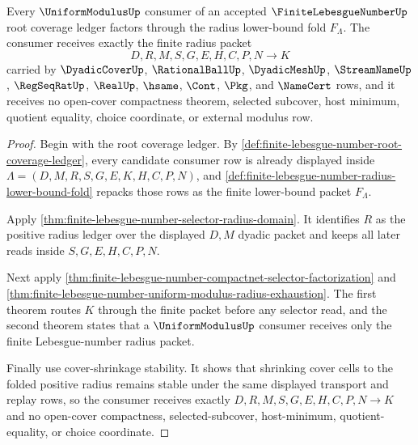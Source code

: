 \begin{theorem}
\label{thm:finite-lebesgue-number-uniform-modulus-consumer-exactness}
Every $\UniformModulusUp$ consumer of an accepted $\FiniteLebesgueNumberUp$ root coverage ledger factors through the radius lower-bound fold $F_\Lambda$. The consumer receives exactly the finite radius packet
$$
D,R,M,S,G,E,H,C,P,N \to K
$$
carried by $\DyadicCoverUp$, $\RationalBallUp$, $\DyadicMeshUp$, $\StreamNameUp$, $\RegSeqRatUp$, $\RealUp$, $\hsame$, $\Cont$, $\Pkg$, and $\NameCert$ rows, and it receives no open-cover compactness theorem, selected subcover, host minimum, quotient equality, choice coordinate, or external modulus row.
\end{theorem}
\begin{proof}
Begin with the root coverage ledger. By \autoref{def:finite-lebesgue-number-root-coverage-ledger}, every candidate consumer row is already displayed inside $\Lambda=(D,M,R,S,G,E,K,H,C,P,N)$, and \autoref{def:finite-lebesgue-number-radius-lower-bound-fold} repacks those rows as the finite lower-bound packet $F_\Lambda$.

Apply \autoref{thm:finite-lebesgue-number-selector-radius-domain}. It identifies $R$ as the positive radius ledger over the displayed $D,M$ dyadic packet and keeps all later reads inside $S,G,E,H,C,P,N$.

Next apply \autoref{thm:finite-lebesgue-number-compactnet-selector-factorization} and \autoref{thm:finite-lebesgue-number-uniform-modulus-radius-exhaustion}. The first theorem routes $K$ through the finite packet before any selector read, and the second theorem states that a $\UniformModulusUp$ consumer receives only the finite Lebesgue-number radius packet.

Finally use cover-shrinkage stability. It shows that shrinking cover cells to the folded positive radius remains stable under the same displayed transport and replay rows, so the consumer receives exactly $D,R,M,S,G,E,H,C,P,N \to K$ and no open-cover compactness, selected-subcover, host-minimum, quotient-equality, or choice coordinate.
\end{proof}

